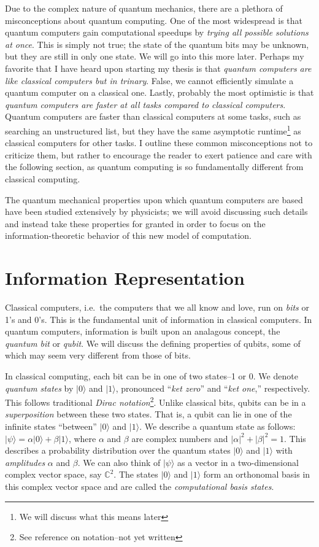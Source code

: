 \documentclass[12pt,twoside]{reedthesis}
\theoremstyle{definition}
\newcommand{\C}{\mathbb{C}}
\newcommand{\ketz}{\ensuremath{\lvert 0\rangle}\xspace}
\newcommand{\keto}{\ensuremath{\lvert 1\rangle}\xspace}
\newcommand{\ketpsi}{\ensuremath{|\psi\rangle}\xspace}
\begin{document}
Due to the complex nature of quantum mechanics, there are a plethora of misconceptions about quantum computing. One of the most widespread is that quantum computers gain computational speedups by \textit{trying all possible solutions at once}. This is simply not true; the state of the quantum bits may be unknown, but they are still in only one state. We will go into this more later. Perhaps my favorite that I have heard upon starting my thesis is that \textit{quantum computers are like classical computers but in trinary}. False, we cannot efficiently simulate a quantum computer on a classical one. Lastly, probably the most optimistic is that \textit{quantum computers are faster at all tasks compared to classical computers}. Quantum computers are faster than classical computers at some tasks, such as searching an unstructured list, but they have the same asymptotic runtime\footnote{We will discuss what this means later} as classical computers for other tasks. I outline these common misconceptions not to criticize them, but rather to encourage the reader to exert patience and care with the following section, as quantum computing is so fundamentally different from classical computing.

The quantum mechanical properties upon which quantum computers are based have been studied extensively by physicists; we will avoid discussing such details and instead take these properties for granted in order to focus on the information-theoretic behavior of this new model of computation. 

\section{Information Representation}
Classical computers, i.e.~the computers that we all know and love, run on \textit{bits} or 1's and 0's. This is the fundamental unit of information in classical computers. In quantum computers, information is built upon an analagous concept, the \textit{quantum bit} or \textit{qubit}. We will discuss the defining properties of qubits, some of which may seem very different from those of bits.

In classical computing, each bit can be in one of two states--1 or 0.  We denote \textit{quantum states} by \ketz and \keto, pronounced ``\textit{ket zero}'' and ``\textit{ket one},'' respectively. This follows traditional \textit{Dirac notation}\footnote{See reference on notation--not yet written}. Unlike classical bits, qubits can be in a \textit{superposition} between these two states. That is, a qubit can lie in one of the infinite states ``between'' \ketz and \keto. We describe a quantum state as follows: $\ketpsi = \alpha \ketz + \beta \keto$, where $\alpha$ and $\beta$ are complex numbers and $\lvert \alpha \rvert ^2+ \lvert \beta \rvert ^2= 1$. This describes a probability distribution over the quantum states \ketz and \keto with \textit{amplitudes} $\alpha$ and $\beta$. We can also think of \ketpsi as a vector in a two-dimensional complex vector space, say $\C^2$. The states \ketz and \keto form an orthonomal basis in this complex vector space and are called the \textit{computational basis states}.
\end{document}
